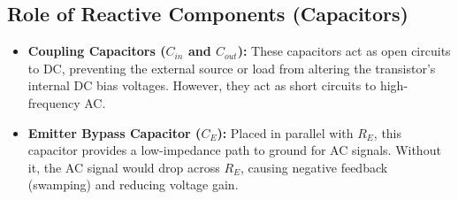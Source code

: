 \subsection{Role of Reactive Components (Capacitors)}
\begin{itemize}
	\item \textbf{Coupling Capacitors ($C_{in}$ and $C_{out}$):} These capacitors act as open circuits to DC, preventing the external source or load from altering the transistor's internal DC bias voltages. However, they act as short circuits to high-frequency AC.
	\item \textbf{Emitter Bypass Capacitor ($C_E$):} Placed in parallel with $R_E$, this capacitor provides a low-impedance path to ground for AC signals. Without it, the AC signal would drop across $R_E$, causing negative feedback (swamping) and reducing voltage gain.
\end{itemize}

\begin{table}[H]
	\centering
	\caption{List of Equipment and Components Used}
	\vspace{2mm}
	\label{tab:apparatus8}
\end{table}


